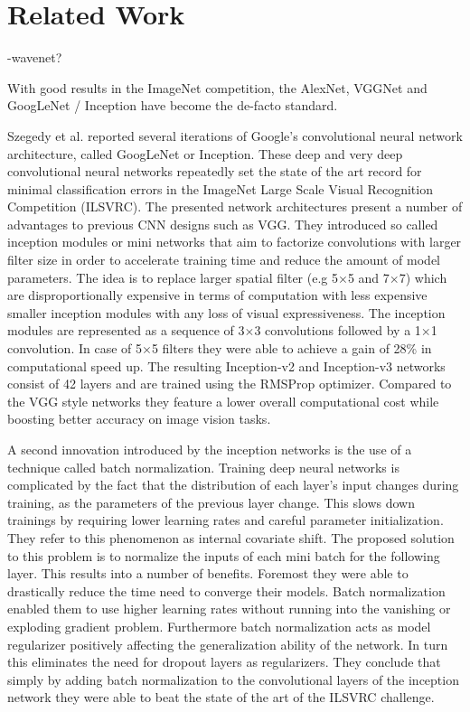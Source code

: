\section{Related Work}
\label{sec:related_work}

-wavenet?

With good results in the ImageNet competition, the AlexNet\cite{krizhevsky2012imagenet}, VGGNet\cite{simonyan2014very} and GoogLeNet / Inception\cite{szegedy2015going} have become the de-facto standard.

Szegedy et al. reported several iterations of Google's convolutional neural network architecture, called GoogLeNet or Inception\cite{szegedy2015going, szegedy2016rethinking, szegedy2016inception}. These deep and very deep convolutional neural networks repeatedly set the state of the art record for minimal classification errors in the ImageNet Large Scale Visual Recognition Competition (ILSVRC). The presented network architectures present a number of advantages to previous CNN designs such as VGG. They introduced so called inception modules or mini networks that aim to factorize convolutions with larger filter size in order to accelerate training time and reduce the amount of model parameters. The idea is to replace larger spatial filter (e.g 5$\times$5 and 7$\times$7) which are disproportionally expensive in terms of computation with less expensive smaller inception modules with any loss of visual expressiveness. The inception modules are represented as a sequence of 3$\times$3 convolutions followed by a 1$\times$1 convolution. In case of 5$\times$5 filters they were able to achieve a gain of 28\% in computational speed up. The resulting Inception-v2 and Inception-v3 networks consist of 42 layers and are trained using the RMSProp\cite{tieleman2012lecture} optimizer. Compared to the VGG style networks they feature a lower overall computational cost while boosting better accuracy on image vision tasks.

A second innovation introduced by the inception networks is the use of a technique called batch normalization\cite{ioffe2015batch}. Training deep neural networks is complicated by the fact that the distribution of each layer's input changes during training, as the parameters of the previous layer change. This slows down trainings by requiring lower learning rates and careful parameter initialization. They refer to this phenomenon as internal covariate shift. The proposed solution to this problem is to normalize the inputs of each mini batch for the following layer. This results into a number of benefits. Foremost they were able to drastically reduce the time need to converge their models. Batch normalization enabled them to use higher learning rates without running into the vanishing or exploding gradient problem. Furthermore batch normalization acts as model regularizer positively affecting the generalization ability of the network. In turn this eliminates the need for dropout layers as regularizers. They conclude that simply by adding batch normalization to the convolutional layers of the inception network they were able to beat the state of the art of the ILSVRC challenge.


